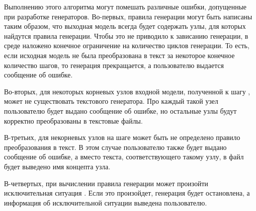 Выполнению этого алгоритма могут помешать различные ошибки, допущенные при разработке генераторов. Во-первых, правила
генерации могут быть написаны таким образом, что выходная модель всегда будет содержать узлы, для которых найдутся правила
генерации. Чтобы это не приводило к зависанию генерации, в среде \MPS{} наложено конечное ограничение на количество циклов
генерации. То есть, если исходная модель не была преобразована в текст за некоторое конечное количество шагов, то генерация
прекращается,  а пользователю выдается сообщение об ошибке.

Во-вторых, для некоторых корневых узлов входной модели, полученной к шагу , может не существовать
текстового генератора. Про каждый такой узел пользователю будет выдано сообщение об ошибке, но остальные узлы будут
корректно преобразованы в текстовые файлы.

В-третьих, для некорневых узлов на шаге  может быть не определено правило преобразования в текст. В этом
случае пользователю также будет выдано сообщение об ошибке, а вместо текста, соответствующего такому узлу, в файл будет
выведено имя концепта узла.

В-четвертых, при вычислении правила генерации может произойти исключительная ситуация \cite{eckel}. Если это произойдет,
генерация будет остановлена, а информация об исключительной ситуации выведена пользователю.
